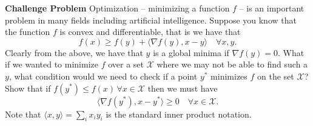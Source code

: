 \textbf{Challenge Problem}
Optimization -- minimizing a function $f$ -- is an important problem in many fields
including artificial intelligence. Suppose you know that the function $f$ is convex
and differentiable, that is we have that
\[
	f(x) \geq f(y) + \langle \nabla f(y),x-y\rangle \quad \forall x, y.
\]
Clearly from the above, we have that $y$ is a global minima if $\nabla f(y) = 0$. 
What if we wanted to minimize $f$ over a set $\mathcal{X}$ where we may not be able
to find such a $y$, what condition would we need to check if a point $y^\ast$ minimizes
$f$ on the set $\mathcal{X}$?
Show that if $f(y^\ast) \leq f(x) \, \forall x \in \mathcal{X}$ then we must have
\[
	\langle \nabla f(y^\ast),x-y^\ast \rangle \geq 0 \quad \forall x \in \mathcal{X}.
\]
Note that $\langle x, y \rangle = \sum_i x_i y_i$ is the standard inner product notation.
